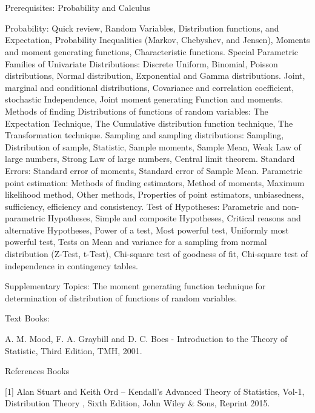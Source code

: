 \section{\courseinfo}

Prerequisites: Probability and Calculus

Probability: Quick review, Random Variables, Distribution functions, and Expectation, Probability Inequalities (Markov, Chebyshev, and Jensen), Moments and moment generating functions, Characteristic functions. Special Parametric Families of Univariate Distributions: Discrete Uniform, Binomial, Poisson distributions, Normal distribution, Exponential and Gamma distributions. Joint, marginal and conditional distributions, Covariance and correlation coefficient, stochastic Independence, Joint moment generating Function and moments. Methods of finding Distributions of functions of random variables: The Expectation Technique, The Cumulative distribution function technique, The Transformation technique. Sampling and sampling distributions: Sampling, Distribution of sample, Statistic, Sample moments, Sample Mean, Weak Law of large numbers, Strong Law of large numbers, Central limit theorem. Standard Errors: Standard error of moments, Standard error of Sample Mean. Parametric point estimation: Methods of finding estimators, Method of moments, Maximum likelihood method, Other methods, Properties of point estimators, unbiasedness, sufficiency, efficiency and consistency. Test of Hypotheses: Parametric and non-parametric Hypotheses, Simple and composite Hypotheses, Critical reasons and alternative Hypotheses, Power of a test, Most powerful test, Uniformly most powerful test, Tests on Mean and variance for a sampling from normal distribution (Z-Test, t-Test), Chi-square test of goodness of fit, Chi-square test of independence in contingency tables.

Supplementary Topics: 
The moment generating function technique for determination of distribution of functions of random variables.

Text Books: 

A. M. Mood, F. A. Graybill and D. C. Boes - Introduction to the Theory of Statistic, Third Edition, TMH, 2001.

References Books 

[1] Alan Stuart and Keith Ord – Kendall’s Advanced Theory of Statistics, Vol-1, Distribution Theory , Sixth Edition, John Wiley \& Sons, Reprint 2015.

